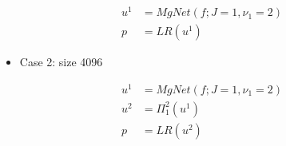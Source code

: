 \begin{align}
u^1 & = MgNet(f; J=1, \nu_1=2)  \\
p & = LR(u^1)
\end{align}


\begin{table}[H]
	\caption{ResNet18 on CIFAR-10: $J=1,\nu_1=2,c_f^1=c_u^1=8$, without the last average pooling}
	\label{case1: mgnet without last pooling}
	\begin{center}
		
	\end{center}
\end{table}



\begin{itemize}
\item Case 2: size 4096
\end{itemize}
\begin{align}
u^1 & = MgNet(f; J=1, \nu_1=2)  \\
u^{2} & = {\Pi}_1^2(u^1) \\
p & = LR(u^2)
\end{align}
\begin{table}[!htbp]
	\caption{ResNet18 on CIFAR-10: $J=1,\nu_1=2,c_f^1=c_u^1=8$, with stride 2 pooling (16 channels)}
	\begin{center}
	\end{center}
\end{table}




